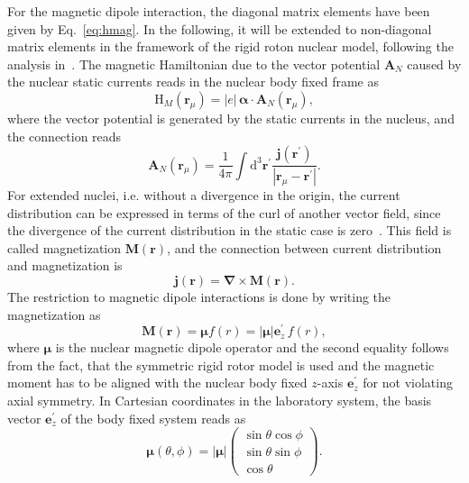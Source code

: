 For the magnetic dipole interaction, the diagonal matrix elements have been given by Eq.~\eqref{eq:hmag}. In the following, it will be extended to non-diagonal matrix elements in the framework of the rigid roton nuclear model, following the analysis in~\cite{Steffen1985}. The magnetic Hamiltonian due to the vector potential $\mathbf{A}_N$ caused by the nuclear static currents reads in the nuclear body fixed frame as
\begin{equation}
\label{eq:Hmag_rot}
\text{H}_{M}(\mathbf{r}_\mu) = |e|\,\boldsymbol{\alpha}\cdot \mathbf{A}_N(\mathbf{r}_\mu),
\end{equation}
where the vector potential is generated by the static currents in the nucleus, and the connection reads~\cite{jackson1999}
\begin{equation}
\mathbf{A}_N(\mathbf{r}_\mu) = \frac{1}{4\pi}\int\text{d}^3\mathbf{r}^\prime \frac{\mathbf{j}(\mathbf{r}^\prime)}{|\mathbf{r}_\mu-\mathbf{r}^\prime|}.
\end{equation}
For extended nuclei, i.e. without a divergence in the origin, the current distribution can be expressed in terms of the curl of another vector field, since the divergence of the current distribution in the static case is zero~\cite{jackson1999}. This field is called magnetization $\mathbf{M}(\mathbf{r})$, and the connection between current distribution and magnetization is
\begin{equation}
\mathbf{j}(\mathbf{r}) = \boldsymbol{\nabla} \times  \mathbf{M}(\mathbf{r}).
\end{equation}
The restriction to magnetic dipole interactions is done by writing the magnetization as
\begin{equation}
\mathbf{M}(\mathbf{r})=\boldsymbol{\mu}f(r)=|\boldsymbol{\mu}|\mathbf{e}_z^\prime\,f(r),
\end{equation}
where $\boldsymbol{\mu}$ is the nuclear magnetic dipole operator and the second equality follows from the fact, that the symmetric rigid rotor model is used and the magnetic moment has to be aligned with the nuclear body fixed $z$-axis $\mathbf{e}_z^\prime$ for not violating axial symmetry.
In Cartesian coordinates in the laboratory system, the basis vector $\mathbf{e}_z^\prime$ of the body fixed system reads as
\begin{equation}
\label{eq:magMomOp}
\boldsymbol{\mu}(\theta,\phi)=|\boldsymbol{\mu}|
\begin{pmatrix}
\sin\theta\cos\phi \\ \sin\theta\sin\phi \\ \cos\theta
\end{pmatrix}.
\end{equation}
